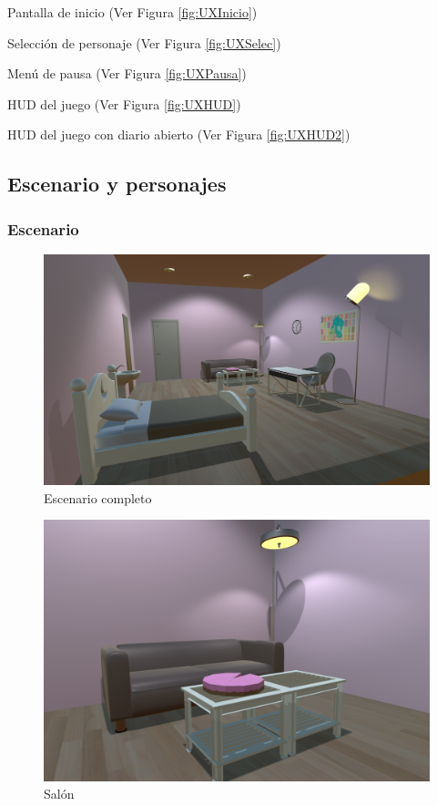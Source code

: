 \documentclass[12pt, a4paper,twoside,titlepage]{book}
\begin{document}
Pantalla de inicio (Ver Figura \ref{fig:UXInicio})

Selección de personaje (Ver Figura \ref{fig:UXSelec})

Menú de pausa (Ver Figura \ref{fig:UXPausa})

HUD del juego (Ver Figura \ref{fig:UXHUD})

HUD del juego con diario abierto (Ver Figura \ref{fig:UXHUD2})





\subsection{Escenario y personajes}
\subsubsection{Escenario}


\begin{figure}
	\centering
	\includegraphics[width=1\linewidth]{TGF/Artes/Escenario.png}
	\caption{Escenario completo}
	\label{fig:ArtesEsce}
\end{figure}

\begin{figure}
	\centering
	\includegraphics[width=.9\linewidth]{TGF/Artes/Saloncito.png}
	\caption{Salón}
	\label{fig:ArtesSalon}
\end{figure}
\end{document}
